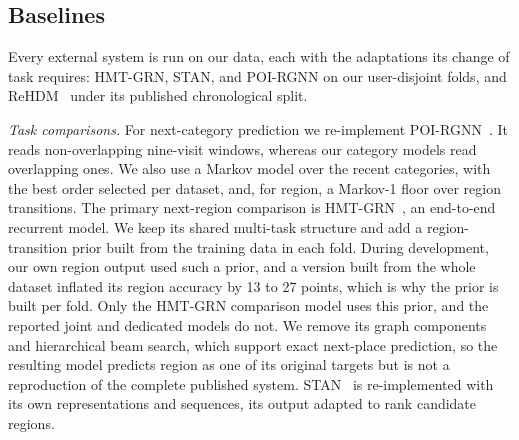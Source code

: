 
\subsection{Baselines}
\label{sec:setup-baselines}
Every external system is run on our data, each with the adaptations its change of task requires:
HMT-GRN, STAN, and POI-RGNN on our user-disjoint folds, and ReHDM~\cite{li2025rehdm} under its
published chronological split.

\emph{Task comparisons.} For next-category prediction we re-implement POI-RGNN~\cite{capanema2023poirgnn}. It reads non-overlapping nine-visit windows,
whereas our category models read overlapping ones. We also use a Markov model over the recent
categories, with the best order selected per dataset, and, for region, a Markov-1 floor over region
transitions. The primary next-region comparison is
HMT-GRN~\cite{lim2022hmtgrn}, an end-to-end recurrent model. We keep its shared multi-task structure and add a region-transition prior built from the training data in
each fold. During development, our own region output used such a prior, and a version built from the whole
dataset inflated its region accuracy by 13 to 27 points, which is why the prior is built per fold.
Only the HMT-GRN comparison model uses this prior, and the reported joint and dedicated models do
not. We remove
its graph components and hierarchical beam search, which support exact next-place prediction, so
the resulting model predicts region as one of its original targets but is
not a reproduction of the complete published system. STAN~\cite{luo2021stan} is re-implemented with its own
representations and sequences, its output adapted to rank candidate regions.

